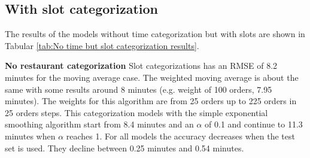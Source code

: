 \subsection{With slot categorization}
The results of the models without time categorization but with slots are shown in Tabular \ref{tab:No time but slot categorization results}.
\begin{table}[h]
\centering
\caption{No time but slot categorization}
\label{tab:No time but slot categorization results}
\end{table}
\newline\newline\textbf{No restaurant categorization}\newline
Slot categorizations has an RMSE of 8.2 minutes for the moving average case. The weighted moving average is about the same with some results around 8 minutes (e.g. weight of 100 orders, 7.95 minutes). The weights for this algorithm are from 25 orders up to 225 orders in 25 orders steps. This categorization models with the simple exponential smoothing algorithm start from 8.4 minutes and an $\alpha$ of 0.1 and continue to 11.3 minutes when $\alpha$ reaches 1. For all models the accuracy decreases when the test set is used. They decline between 0.25 minutes and 0.54 minutes.\newline
